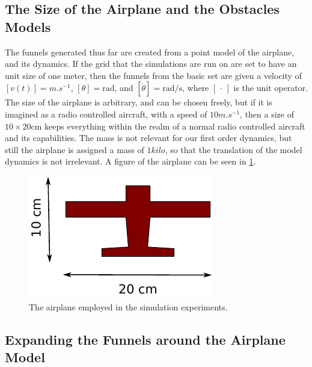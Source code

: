 \subsection{The Size of the Airplane and the Obstacles Models}
\label{subsec:deciding-model-size}

The funnels generated thus far are created from a point model of the airplane,
and its dynamics. If the grid that the simulations are run on are set to have an
unit size of one meter, then the funnels from the basic set are given a velocity
of \([v(t)] = \si{m.s^{-1}}\), \([\theta] = \si{\radian}\), and \([\dot{\theta}]
= \si{\radian\per\second}\), where \( [\, \cdot \,] \) is the unit operator. The
size of the airplane is arbitrary, and can be chosen freely, but if it is
imagined as a radio controlled aircraft, with a speed of \(10\si{m.s^{-1}}\),
then a size of \(10 \times 20 \si{\centi\metre} \) keeps everything within the
realm of a normal radio controlled aircraft and its capabilities. The mass is
not relevant for our first order dynamics, but still the airplane is assigned a
mass of \(1 \textit{kilo}\), so that the translation of the model dynamics is not
irrelevant. A figure of the airplane can be seen in \cref{fig:radio-vehicle}.

\begin{figure}
  \centering
  \includegraphics[width=.5\textwidth]{figures/experiments/radio-vehicle-model}
  \caption[The experiment airplane model]{The airplane employed in the simulation experiments.}
  \label{fig:radio-vehicle}
\end{figure}

\subsection{Expanding the Funnels around the Airplane Model}
\label{subsec:expand-funnel}

